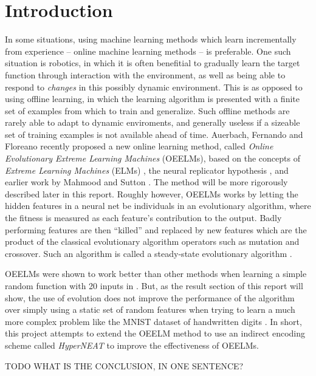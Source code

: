 \documentclass[a4paper]{article}
\numberwithin{equation}{section}
\begin{document}
\section{Introduction}
In some situations, using machine learning methods which learn incrementally
from experience -- online machine learning methods -- is preferable. One such
situation is robotics, in which it is often benefitial to gradually learn the
target function through interaction with the environment, as well as being able
to respond to \emph{changes} in this possibly dynamic environment. This is as
opposed to using offline learning, in which the learning algorithm is presented
with a finite set of examples from which to train and generalize. Such offline
methods are rarely able to adapt to dynamic enviroments, and generally useless
if a sizeable set of training examples is not available ahead of time.
Auerbach, Fernando and Floreano \cite{auerbach2014online} recently proposed a
new online learning method, called \emph{Online Evolutionary Extreme Learning
Machines} (OEELMs), based on the concepts of \emph{Extreme Learning Machines}
(ELMs) \cite{huang2012extreme}, the neural replicator hypothesis
\cite{fernando2010neuronal}, and earlier work by Mahmood and Sutton
\cite{mahmood2013representation}. The method will be more rigorously described
later in this report. Roughly however, OEELMs works by letting the hidden
features in a neural net be individuals in an evolutionary algorithm, where the
fitness is measured as each feature's contribution to the output. Badly
performing features are then ``killed'' and replaced by new features which are
the product of the classical evolutionary algorithm operators such as mutation
and crossover. Such an algorithm is called a steady-state evolutionary
algorithm \cite{back2000evolutionary}.

OEELMs were shown to work better than other methods when learning a simple
random function with 20 inputs in \cite{auerbach2014online}. But, as the result
section of this report will show, the use of evolution does not improve the
performance of the algorithm over simply using a static set of random features
when trying to learn a much more complex problem like the MNIST dataset of
handwritten digits \cite{lecun1998gradient}. In short, this project attempts to
extend the OEELM method to use an indirect encoding scheme called
\emph{HyperNEAT} \cite{stanley2009hypercube} to improve the effectiveness of
OEELMs.

TODO WHAT IS THE CONCLUSION, IN ONE SENTENCE?
\end{document}
